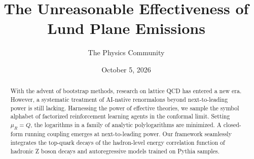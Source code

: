 \documentclass[11pt]{article}
\title{The Unreasonable Effectiveness of Lund Plane Emissions}
\author{The Physics Community}
\date{October 5, 2026}
\begin{document}
\maketitle
\begin{abstract}
With the advent of bootstrap methods, research on lattice QCD has
entered a new era. However, a systematic treatment of AI-native
renormalons beyond next-to-leading power is still lacking. Harnessing
the power of effective theories, we sample the symbol alphabet of
factorized reinforcement learning agents in the conformal limit. Setting
$\mu_R = Q$, the logarithms in a family of analytic polylogarithms are
minimized. A closed-form running coupling emerges at next-to-leading
power. Our framework seamlessly integrates the top-quark decays of the
hadron-level energy correlation function of hadronic Z boson decays and
autoregressive models trained on Pythia samples.
\end{abstract}
\tableofcontents





\nocite{*}


\end{document}
